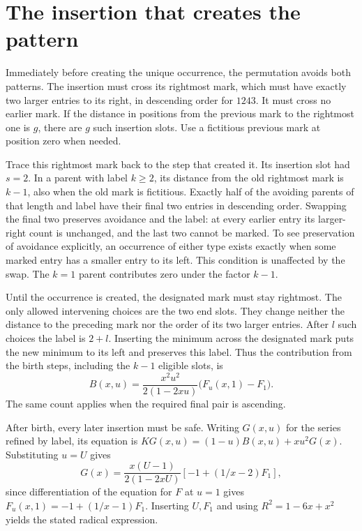 \documentclass[11pt,letterpaper]{article}
\begin{document}
\section{The insertion that creates the pattern}
Immediately before creating the unique occurrence, the permutation avoids both patterns. The insertion must cross its rightmost mark, which must have exactly two larger entries to its right, in descending order for \(1243\). It must cross no earlier mark. If the distance in positions from the previous mark to the rightmost one is \(g\), there are \(g\) such insertion slots. Use a fictitious previous mark at position zero when needed.

Trace this rightmost mark back to the step that created it. Its insertion slot had \(s=2\). In a parent with label \(k\ge2\), its distance from the old rightmost mark is \(k-1\), also when the old mark is fictitious. Exactly half of the avoiding parents of that length and label have their final two entries in descending order. Swapping the final two preserves avoidance and the label: at every earlier entry its larger-right count is unchanged, and the last two cannot be marked. To see preservation of avoidance explicitly, an occurrence of either type exists exactly when some marked entry has a smaller entry to its left. This condition is unaffected by the swap. The \(k=1\) parent contributes zero under the factor \(k-1\).

Until the occurrence is created, the designated mark must stay rightmost. The only allowed intervening choices are the two end slots. They change neither the distance to the preceding mark nor the order of its two larger entries. After \(l\) such choices the label is \(2+l\). Inserting the minimum across the designated mark puts the new minimum to its left and preserves this label. Thus the contribution from the birth steps, including the \(k-1\) eligible slots, is
\[
 B(x,u)=\frac{x^2u^2}{2(1-2xu)}\bigl(F_u(x,1)-F_1\bigr).
\]
The same count applies when the required final pair is ascending.

After birth, every later insertion must be safe. Writing \(G(x,u)\) for the series refined by label, its equation is \(K G(x,u)=(1-u)B(x,u)+xu^2G(x)\). Substituting \(u=U\) gives
\[
 G(x)=\frac{x(U-1)}{2(1-2xU)}
       \left[-1+(1/x-2)F_1\right],
\]
since differentiation of the equation for \(F\) at \(u=1\) gives \(F_u(x,1)=-1+(1/x-1)F_1\). Inserting \(U,F_1\) and using \(R^2=1-6x+x^2\) yields the stated radical expression.
\end{document}
